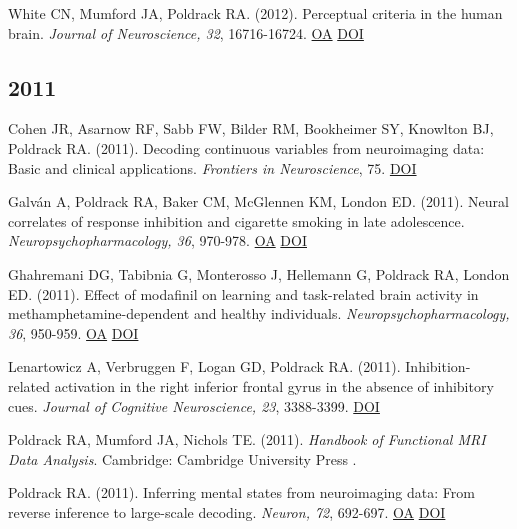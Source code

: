 \documentclass[10pt, letterpaper]{article}
\begin{document}
White CN, Mumford JA, Poldrack RA.  (2012). Perceptual criteria in the human brain. \textit{Journal of Neuroscience, 32}, 16716-16724. \href{https://www.ncbi.nlm.nih.gov/pmc/articles/PMC6621768}{OA} \href{https://doi.org/10.1523/jneurosci.1744-12.2012}{DOI} \vspace{2mm}

\subsection*{2011}Cohen JR, Asarnow RF, Sabb FW, Bilder RM, Bookheimer SY, Knowlton BJ, Poldrack RA.  (2011). Decoding continuous variables from neuroimaging data: Basic and clinical applications. \textit{Frontiers in Neuroscience}, 75. \href{https://doi.org/10.3389/fnins.2011.00075}{DOI} \vspace{2mm}

Galván A, Poldrack RA, Baker CM, McGlennen KM, London ED.  (2011). Neural correlates of response inhibition and cigarette smoking in late adolescence. \textit{Neuropsychopharmacology, 36}, 970-978. \href{https://www.ncbi.nlm.nih.gov/pmc/articles/PMC3077266}{OA} \href{https://doi.org/10.1038/npp.2010.235}{DOI} \vspace{2mm}

Ghahremani DG, Tabibnia G, Monterosso J, Hellemann G, Poldrack RA, London ED.  (2011). Effect of modafinil on learning and task-related brain activity in methamphetamine-dependent and healthy individuals. \textit{Neuropsychopharmacology, 36}, 950-959. \href{https://www.ncbi.nlm.nih.gov/pmc/articles/PMC3077264}{OA} \href{https://doi.org/10.1038/npp.2010.233}{DOI} \vspace{2mm}

Lenartowicz A, Verbruggen F, Logan GD, Poldrack RA.  (2011). Inhibition-related activation in the right inferior frontal gyrus in the absence of inhibitory cues. \textit{Journal of Cognitive Neuroscience, 23}, 3388-3399. \href{https://doi.org/10.1162/jocn_a_00031}{DOI} \vspace{2mm}

Poldrack RA, Mumford JA, Nichols TE.  (2011).  \textit{Handbook of Functional MRI Data Analysis}. Cambridge: Cambridge University Press .\vspace{2mm}

Poldrack RA.  (2011). Inferring mental states from neuroimaging data: From reverse inference to large-scale decoding. \textit{Neuron, 72}, 692-697. \href{https://www.ncbi.nlm.nih.gov/pmc/articles/PMC3240863}{OA} \href{https://doi.org/10.1016/j.neuron.2011.11.001}{DOI} \vspace{2mm}
\end{document}
